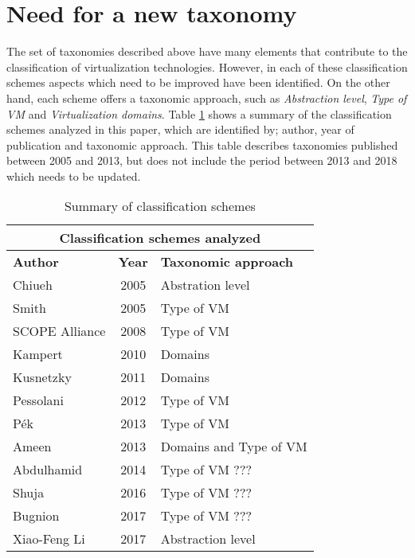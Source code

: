 	\section {Need for a new taxonomy}\label{sec:necesidadDeUnaTaxonomia}
	
	The set of taxonomies described above have many elements that contribute to the classification of virtualization technologies. However, in each of these classification schemes aspects which need to be improved have been identified. On the other hand, each scheme offers a taxonomic approach, such as \textit{Abstraction level}, \textit{Type of VM} and \textit{Virtualization domains}. Table \ref{cuadro:resumenTrabajos} shows a summary of the classification schemes analyzed in this paper, which are identified by; author, year of publication and taxonomic approach. This table describes taxonomies published between 2005 and 2013, but does not include the period between 2013 and 2018 which needs to be updated.
	
	
	\begin{table}[H]
		\centering
		\begin{tabular}{|l|c|l|}
			\hline
			\multicolumn{3}{|c|}{\textbf{Classification schemes analyzed}}\\
			\hline
			\textbf{Author} & \textbf{Year} & \textbf{Taxonomic approach} \\ 
			\hline
			Chiueh          & 2005          & Abstration level\\ 
			\hline
			Smith           & 2005          & Type of VM\\ 
			\hline
			SCOPE Alliance  & 2008          & Type of VM\\ 
			\hline
			Kampert         & 2010          & Domains\\ 
			\hline
			Kusnetzky       & 2011          & Domains\\ 
			\hline
			Pessolani       & 2012          & Type of VM\\ 
			\hline
			P{\'e}k         & 2013          & Type of VM\\ 
			\hline
			Ameen           & 2013          & Domains and Type of VM\\ 
			\hline
			Abdulhamid      & 2014          & Type of VM ???\\ 
			\hline
			Shuja           & 2016          & Type of VM ???\\ 
			\hline
			Bugnion         & 2017          & Type of VM ???\\ 
			\hline
			Xiao-Feng Li    & 2017          & Abstraction level\\ 
			\hline
		\end{tabular}
		\caption{Summary of classification schemes}
		\label{cuadro:resumenTrabajos}
		
	\end{table}

